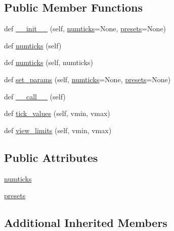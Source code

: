 \subsection*{Public Member Functions}
\begin{DoxyCompactItemize}
\item 
def \hyperlink{classmatplotlib_1_1ticker_1_1LinearLocator_a202095a556b3522a690f8992225f587a}{\+\_\+\+\_\+init\+\_\+\+\_\+} (self, \hyperlink{classmatplotlib_1_1ticker_1_1LinearLocator_a3262ce758d5e43beefb69c523fe3d8ab}{numticks}=None, \hyperlink{classmatplotlib_1_1ticker_1_1LinearLocator_a36e9a6ff0881ba6935c7d11a48126ebe}{presets}=None)
\item 
def \hyperlink{classmatplotlib_1_1ticker_1_1LinearLocator_a301c33834116649ad1f82167d8bfb701}{numticks} (self)
\item 
def \hyperlink{classmatplotlib_1_1ticker_1_1LinearLocator_adb3f558dce83c6309d58a39696eda79e}{numticks} (self, numticks)
\item 
def \hyperlink{classmatplotlib_1_1ticker_1_1LinearLocator_aff29abcd8c7cab767071da2ed83e0457}{set\+\_\+params} (self, \hyperlink{classmatplotlib_1_1ticker_1_1LinearLocator_a3262ce758d5e43beefb69c523fe3d8ab}{numticks}=None, \hyperlink{classmatplotlib_1_1ticker_1_1LinearLocator_a36e9a6ff0881ba6935c7d11a48126ebe}{presets}=None)
\item 
def \hyperlink{classmatplotlib_1_1ticker_1_1LinearLocator_aaa22576e5f40a38c72f65ae24df24d7c}{\+\_\+\+\_\+call\+\_\+\+\_\+} (self)
\item 
def \hyperlink{classmatplotlib_1_1ticker_1_1LinearLocator_a8624f460ed83838ebde9535cfd3c5520}{tick\+\_\+values} (self, vmin, vmax)
\item 
def \hyperlink{classmatplotlib_1_1ticker_1_1LinearLocator_ac6d0b7e3eec04a54d8a22bb9252edf31}{view\+\_\+limits} (self, vmin, vmax)
\end{DoxyCompactItemize}
\subsection*{Public Attributes}
\begin{DoxyCompactItemize}
\item 
\hyperlink{classmatplotlib_1_1ticker_1_1LinearLocator_a3262ce758d5e43beefb69c523fe3d8ab}{numticks}
\item 
\hyperlink{classmatplotlib_1_1ticker_1_1LinearLocator_a36e9a6ff0881ba6935c7d11a48126ebe}{presets}
\end{DoxyCompactItemize}
\subsection*{Additional Inherited Members}


